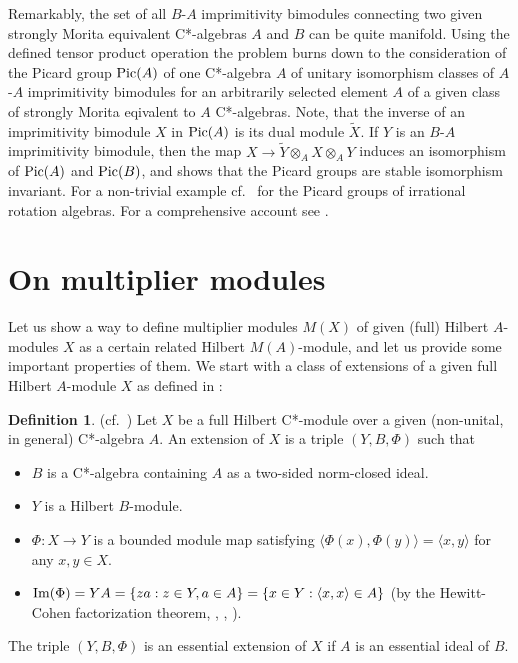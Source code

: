 \documentclass{amsart}
\theoremstyle{definition}
\newtheorem{dfn}[thm]{Definition}
\begin{document}
Remarkably, the set of all $B$-$A$ imprimitivity bimodules connecting two given strongly Morita equivalent C*-algebras $A$ and $B$ can be quite manifold. Using the defined tensor product operation the problem burns down to the consideration of the Picard group ${\rm Pic} (A)$ of one C*-algebra $A$ of unitary isomorphism classes of $A$-$A$ imprimitivity bimodules for an arbitrarily selected element $A$ of a given class of strongly Morita eqivalent to $A$ C*-algebras. Note, that the inverse of an imprimitivity bimodule $X$ in ${\rm Pic}(A)$ is its dual module ${\tilde X}$. If $Y$ is an $B$-$A$ imprimitivity bimodule, then the map $X \to {\tilde Y} \otimes_A X \otimes_A Y$ induces an isomorphism of ${\rm Pic}(A)$ and ${\rm Pic}(B)$, and \cite[Theorem 1.2]{BGR_1977} shows that the Picard groups are stable isomorphism invariant. For a non-trivial example cf.~\cite{Kodaka_1997} for the Picard groups of irrational rotation algebras. For a comprehensive account see \cite[sec. 6-7]{BW}.





\section{On multiplier modules}

Let us show a way to define multiplier modules $M(X)$ of given (full) Hilbert $A$-modules $X$ as a certain related Hilbert $M(A)$-module, and let us provide some important properties of them. We start with a class of extensions of a given full Hilbert $A$-module $X$ as defined in \cite{BG_2004}:

\begin{dfn} (cf.~\cite[Def.~1.1]{BG_2004}) \label{dfn_extensions}
Let $X$ be a full Hilbert C*-module over a given (non-unital, in general) C*-algebra $A$. An extension of $X$ is a triple $(Y,B,\Phi)$ such that
\begin{itemize}
   \item[(i)$\,\,\,\,$] $B$ is a C*-algebra containing $A$ as a two-sided norm-closed ideal.
   \item[(ii)$\,\,$] $Y$ is a Hilbert $B$-module. 
   \item[(iii)] $\Phi: X \to Y$ is a bounded module map satisfying $\langle \Phi(x),\Phi(y) \rangle = \langle x,y \rangle$ for any $x,y \in X$.
   \item[(iv)] ${\rm Im}(\Phi) = YA = \{ za : z \in Y, a \in A \} = \{ x \in Y : \langle x,x \rangle \in A \}$ (by the Hewitt-Cohen factorization theorem, \cite[Thm.~4.1]{Pedersen_1998}, \cite[Prop.~2.31]{RW_1998}, \cite[Thm.~23.22]{Hewitt_Ross_1970}).
\end{itemize}
The triple $(Y,B,\Phi)$ is an essential extension of $X$ if $A$ is an essential ideal of $B$.
\end{dfn}
\end{document}
